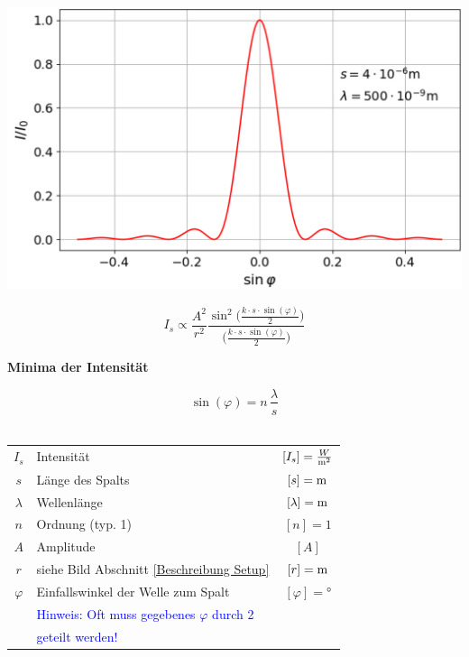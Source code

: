 \begin{minipage}{0.58\linewidth}
\includegraphics[width=0.98\linewidth]{Bilder/Wellen-Optik/beugung_spalt_intensitaet} \\
\end{minipage}
\hfill
\begin{minipage}{0.4\linewidth}
$$ \boxed{ I_s \varpropto \frac{A^2}{r^2} \frac{\sin^2\Big( \frac{k \cdot s \cdot \sin(\varphi)}{2} \Big) }{\Big( \frac{k \cdot s \cdot \sin(\varphi)}{2} \Big) } } $$


\textbf{Minima der Intensität} 

$$ \boxed{ \sin(\varphi) = n \, \frac{\lambda}{s}} $$ \\
\end{minipage}



\renewcommand{\arraystretch}{1.1}
\begin{tabular}{clc}
$I_s$ & Intensität & $[I_s] = \frac{W}{\mathrm{m}^2}$ \\
$s$ & Länge des Spalts & $[s] = \mathrm{m}$ \\
$\lambda$ & Wellenlänge & $[\lambda]= \mathrm{m}$ \\
$n$ & Ordnung (typ. 1) & $[n] = 1$ \\
$A$ & Amplitude & $[A]$ \\
$r$ & siehe Bild Abschnitt \ref{Beschreibung Setup} & $[r] = \mathrm{m}$ \\
$\varphi$ & Einfallswinkel der Welle zum Spalt & $[\varphi] =$° \\
 & \textcolor{blue}{Hinweis: Oft muss gegebenes $\varphi$ durch 2} & \\
 & \textcolor{blue}{geteilt werden!} \\
\end{tabular}
\renewcommand{\arraystretch}{1}

